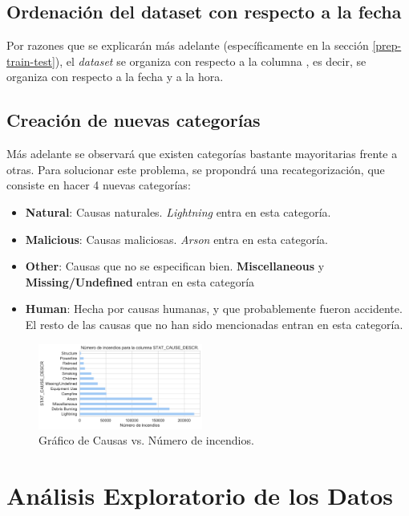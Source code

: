 \subsection{Ordenación del dataset con respecto a la fecha}\label{ord-cr-fecha}
Por razones que se explicarán más adelante (específicamente en la sección \ref{prep-train-test}), el \textit{dataset} se organiza con respecto a la columna , es decir, se organiza con respecto a la fecha y a la hora.

\subsection{Creación de nuevas categorías}\label{subsec:nuevas-cats}
Más adelante se observará que existen categorías bastante mayoritarias frente a otras. Para solucionar este problema, se propondrá una recategorización, que consiste en hacer 4 nuevas categorías:
\begin{itemize}
    \item \textbf{Natural}: Causas naturales. \textit{Lightning} entra en esta categoría.
    \item \textbf{Malicious}: Causas maliciosas. \textit{Arson} entra en esta categoría.
    \item \textbf{Other}: Causas que no se especifican bien. \textbf{Miscellaneous} y \textbf{Missing/Undefined} entran en esta categoría
    \item \textbf{Human}: Hecha por causas humanas, y que probablemente fueron accidente. El resto de las causas que no han sido mencionadas entran en esta categoría.
\end{itemize}

\begin{figure}[!t]
    \centering
    \includegraphics[width=0.48\textwidth]{imagenes/barh_STAT_CAUSE_DESCR.pdf}
    \caption{Gráfico de Causas vs. Número de incendios.}
    \label{fig:SCD}
\end{figure}

\section{Análisis Exploratorio de los Datos}\label{EDA}

